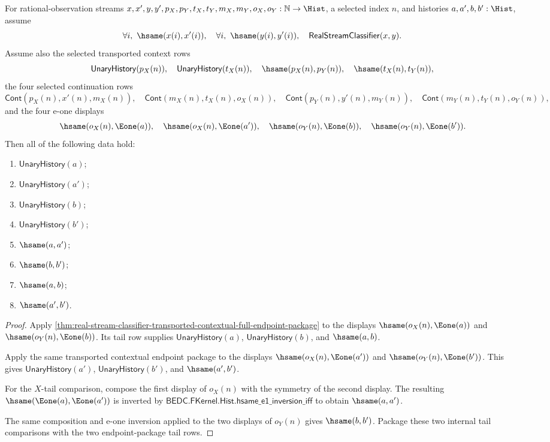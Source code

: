 \begin{theorem}
\label{thm:real-stream-classifier-transported-contextual-e1-tail-determinacy}
For rational-observation streams
$x,x',y,y',p_X,p_Y,t_X,t_Y,m_X,m_Y,o_X,o_Y:\mathbb{N}\to\Hist$, a selected
index $n$, and histories $a,a',b,b':\Hist$, assume
$$
\forall i,\ \hsame(x(i),x'(i)),\quad
\forall i,\ \hsame(y(i),y'(i)),\quad
\mathsf{RealStreamClassifier}(x,y).
$$
Assume also the selected transported context rows
$$
\mathsf{UnaryHistory}(p_X(n)),\quad
\mathsf{UnaryHistory}(t_X(n)),\quad
\hsame(p_X(n),p_Y(n)),\quad
\hsame(t_X(n),t_Y(n)),
$$
the four selected continuation rows
$$
\mathsf{Cont}(p_X(n),x'(n),m_X(n)),\quad
\mathsf{Cont}(m_X(n),t_X(n),o_X(n)),
\quad
\mathsf{Cont}(p_Y(n),y'(n),m_Y(n)),\quad
\mathsf{Cont}(m_Y(n),t_Y(n),o_Y(n)),
$$
and the four e-one displays
$$
\hsame(o_X(n),\Eone(a)),\quad
\hsame(o_X(n),\Eone(a')),\quad
\hsame(o_Y(n),\Eone(b)),\quad
\hsame(o_Y(n),\Eone(b')).
$$
Then all of the following data hold:
\begin{enumerate}
\item $\mathsf{UnaryHistory}(a)$;
\item $\mathsf{UnaryHistory}(a')$;
\item $\mathsf{UnaryHistory}(b)$;
\item $\mathsf{UnaryHistory}(b')$;
\item $\hsame(a,a')$;
\item $\hsame(b,b')$;
\item $\hsame(a,b)$;
\item $\hsame(a',b')$.
\end{enumerate}
\end{theorem}
\begin{proof}
Apply
\autoref{thm:real-stream-classifier-transported-contextual-full-endpoint-package}
to the displays $\hsame(o_X(n),\Eone(a))$ and
$\hsame(o_Y(n),\Eone(b))$. Its tail row supplies
$\mathsf{UnaryHistory}(a)$, $\mathsf{UnaryHistory}(b)$, and $\hsame(a,b)$.

Apply the same transported contextual endpoint package to the displays
$\hsame(o_X(n),\Eone(a'))$ and $\hsame(o_Y(n),\Eone(b'))$. This gives
$\mathsf{UnaryHistory}(a')$, $\mathsf{UnaryHistory}(b')$, and
$\hsame(a',b')$.

For the $X$-tail comparison, compose the first display of $o_X(n)$ with the
symmetry of the second display. The resulting
$\hsame(\Eone(a),\Eone(a'))$ is inverted by
$\mathsf{BEDC.FKernel.Hist.hsame\_e1\_inversion\_iff}$ to obtain
$\hsame(a,a')$.

The same composition and e-one inversion applied to the two displays of
$o_Y(n)$ gives $\hsame(b,b')$. Package these two internal tail comparisons
with the two endpoint-package tail rows.
\end{proof}

